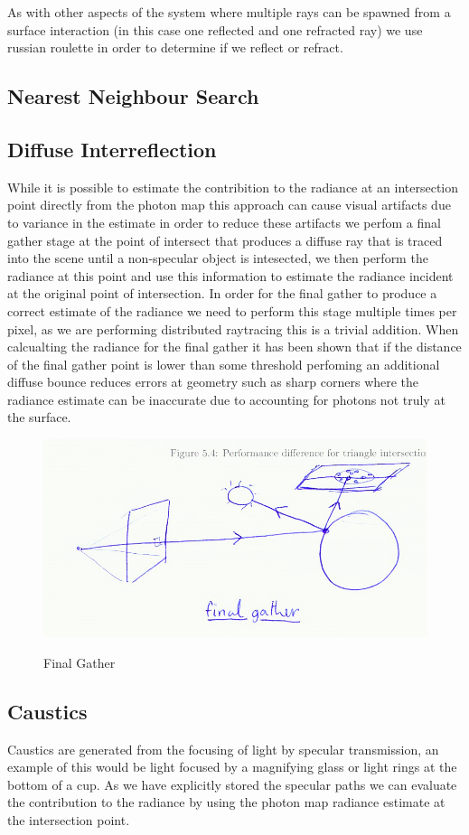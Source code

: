 As with other aspects of the system where multiple rays can be spawned from a surface interaction (in this case one reflected and one refracted ray)
we use russian roulette in order to determine if we reflect or refract.

\subsection{Nearest Neighbour Search}

\subsection{Diffuse Interreflection}
While it is possible to estimate the contribition to the radiance at an intersection point directly from the photon map this
approach can cause visual artifacts due to variance in the estimate in order to reduce these artifacts we perfom a final gather
stage at the point of intersect that produces a diffuse ray that is traced into the scene until a non-specular object is intesected,
we then perform the radiance at this point and use this information to estimate the radiance incident at the original point of intersection.
In order for the final gather to produce a correct estimate of the radiance we need to perform this stage multiple times per pixel, as we
are performing distributed raytracing this is a trivial addition. When calcualting the radiance for the final gather it has been shown 
that if the distance of the final gather point is lower than some threshold perfoming an additional diffuse bounce reduces errors at geometry
such as sharp corners where the radiance estimate can be inaccurate due to accounting for photons not truly at the surface.

\begin{figure}
\centering
\includegraphics[width=\textwidth]{./images/final_gather.png}
\label{fig:final_gather}
\caption{Final Gather}
\end{figure}

\subsection{Caustics}
Caustics are generated from the focusing of light by specular transmission, an example of this would be light focused by a magnifying glass or
light rings at the bottom of a cup. As we have explicitly stored the specular paths we can evaluate the contribution to the radiance by
using the photon map radiance estimate at the intersection point.
